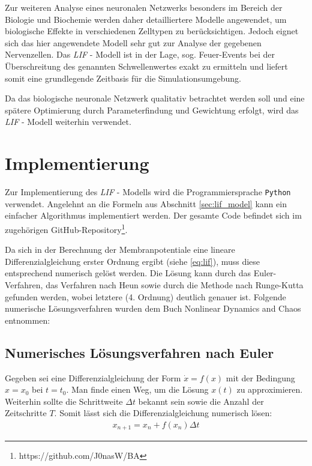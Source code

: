 	Zur weiteren Analyse eines neuronalen Netzwerks besonders im Bereich der Biologie und Biochemie werden daher detailliertere Modelle angewendet, um biologische Effekte in verschiedenen Zelltypen zu berücksichtigen. Jedoch eignet sich das hier angewendete Modell sehr gut zur Analyse der gegebenen Nervenzellen. Das \textit{LIF} - Modell ist in der Lage, sog. Feuer-Events bei der Überschreitung des genannten Schwellenwertes exakt zu ermitteln und liefert somit eine grundlegende Zeitbasis für die Simulationsumgebung.
	
	Da das biologische neuronale Netzwerk qualitativ betrachtet werden soll und eine spätere Optimierung durch Parameterfindung und Gewichtung erfolgt, wird das \textit{LIF} - Modell weiterhin verwendet.

\section{Implementierung}
\label{sec:lif_imp}
	Zur Implementierung des \textit{LIF} - Modells wird die Programmiersprache \texttt{Python} verwendet.  Angelehnt an die Formeln aus Abschnitt \ref{sec:lif_model} kann ein einfacher Algorithmus implementiert werden. Der gesamte Code befindet sich im zugehörigen GitHub-Repository\footnote{https://github.com/J0nasW/BA}.
	
	Da sich in der Berechnung der Membranpotentiale eine lineare Differenzialgleichung erster Ordnung ergibt (siehe \eqref{eq:lif}), muss diese entsprechend numerisch gelöst werden. Die Lösung kann durch das Euler-Verfahren, das Verfahren nach Heun sowie durch die Methode nach Runge-Kutta gefunden werden, wobei letztere (4. Ordnung) deutlich genauer ist. Folgende numerische Lösungsverfahren wurden dem Buch \glqq Nonlinear Dynamics and Chaos\grqq{} \cite{NonlinearDynamics} entnommen:
	\subsection*{Numerisches Lösungsverfahren nach Euler}
		Gegeben sei eine Differenzialgleichung der Form $\dot{x} = f(x)$ mit der Bedingung $x = x_0$ bei $t = t_0$. Man finde einen Weg, um die Lösung $x(t)$ zu approximieren.\\
		Weiterhin sollte die Schrittweite $\Delta t$ bekannt sein sowie die Anzahl der Zeitschritte $T$. Somit lässt sich die Differenzialgleichung numerisch lösen:
		\begin{align}
			\label{eq:euler}
			x_{n+1} = x_n + f(x_n) \Delta t
		\end{align}
